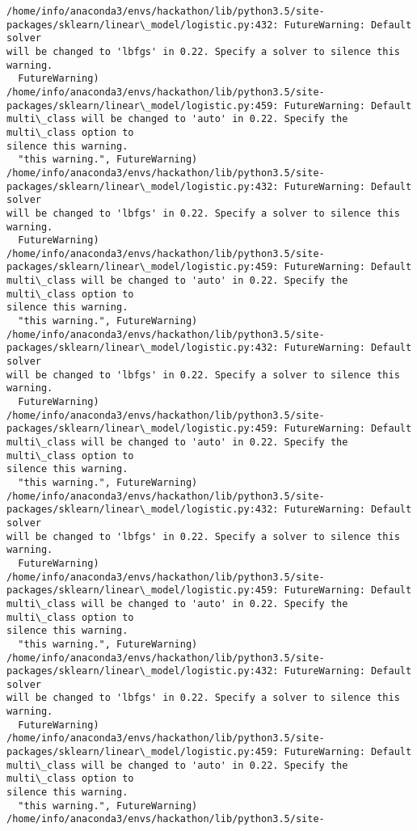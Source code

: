 \documentclass[11pt]{article}
\begin{document}
    \begin{Verbatim}[commandchars=\\\{\}]
/home/info/anaconda3/envs/hackathon/lib/python3.5/site-
packages/sklearn/linear\_model/logistic.py:432: FutureWarning: Default solver
will be changed to 'lbfgs' in 0.22. Specify a solver to silence this warning.
  FutureWarning)
/home/info/anaconda3/envs/hackathon/lib/python3.5/site-
packages/sklearn/linear\_model/logistic.py:459: FutureWarning: Default
multi\_class will be changed to 'auto' in 0.22. Specify the multi\_class option to
silence this warning.
  "this warning.", FutureWarning)
/home/info/anaconda3/envs/hackathon/lib/python3.5/site-
packages/sklearn/linear\_model/logistic.py:432: FutureWarning: Default solver
will be changed to 'lbfgs' in 0.22. Specify a solver to silence this warning.
  FutureWarning)
/home/info/anaconda3/envs/hackathon/lib/python3.5/site-
packages/sklearn/linear\_model/logistic.py:459: FutureWarning: Default
multi\_class will be changed to 'auto' in 0.22. Specify the multi\_class option to
silence this warning.
  "this warning.", FutureWarning)
/home/info/anaconda3/envs/hackathon/lib/python3.5/site-
packages/sklearn/linear\_model/logistic.py:432: FutureWarning: Default solver
will be changed to 'lbfgs' in 0.22. Specify a solver to silence this warning.
  FutureWarning)
/home/info/anaconda3/envs/hackathon/lib/python3.5/site-
packages/sklearn/linear\_model/logistic.py:459: FutureWarning: Default
multi\_class will be changed to 'auto' in 0.22. Specify the multi\_class option to
silence this warning.
  "this warning.", FutureWarning)
/home/info/anaconda3/envs/hackathon/lib/python3.5/site-
packages/sklearn/linear\_model/logistic.py:432: FutureWarning: Default solver
will be changed to 'lbfgs' in 0.22. Specify a solver to silence this warning.
  FutureWarning)
/home/info/anaconda3/envs/hackathon/lib/python3.5/site-
packages/sklearn/linear\_model/logistic.py:459: FutureWarning: Default
multi\_class will be changed to 'auto' in 0.22. Specify the multi\_class option to
silence this warning.
  "this warning.", FutureWarning)
/home/info/anaconda3/envs/hackathon/lib/python3.5/site-
packages/sklearn/linear\_model/logistic.py:432: FutureWarning: Default solver
will be changed to 'lbfgs' in 0.22. Specify a solver to silence this warning.
  FutureWarning)
/home/info/anaconda3/envs/hackathon/lib/python3.5/site-
packages/sklearn/linear\_model/logistic.py:459: FutureWarning: Default
multi\_class will be changed to 'auto' in 0.22. Specify the multi\_class option to
silence this warning.
  "this warning.", FutureWarning)
/home/info/anaconda3/envs/hackathon/lib/python3.5/site-

\end{Verbatim}
\end{document}
